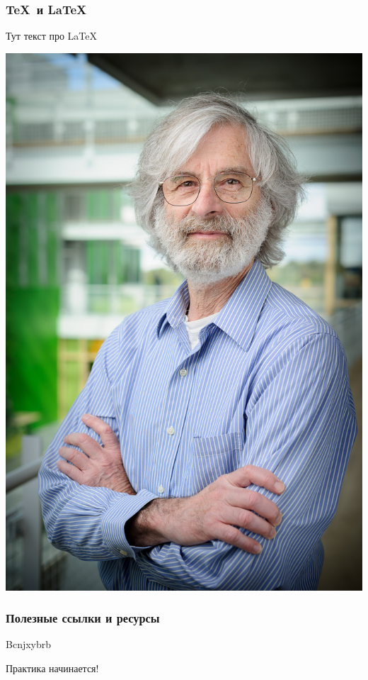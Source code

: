 \documentclass[fullscreen=true]{beamer}
\begin{document}
\begin{frame}
	\frametitle{\TeX ~и \LaTeX}
	Тут текст про \LaTeX
	
	\vfill
	\includegraphics[scale=0.49]{images/lamport.jpg}
\end{frame}

\begin{frame}
	\frametitle{Полезные ссылки и ресурсы}
	Bcnjxybrb 
\end{frame}

\begin{frame}
	\Large {Практика начинается!}
\end{frame}
\end{document}

